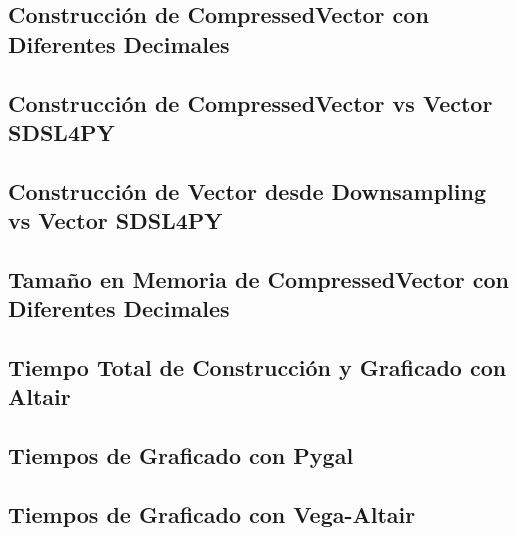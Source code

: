 \subsection{Construcción de CompressedVector con Diferentes Decimales}
\label{exp:cvd-build-decimals}

\subsection{Construcción de CompressedVector vs Vector SDSL4PY}
\label{exp:build-cv-sdsl}

\subsection{Construcción de Vector desde Downsampling vs Vector SDSL4PY}
\label{exp:build-cvd-sdsl}

\subsection{Tamaño en Memoria de CompressedVector con Diferentes Decimales}
\label{exp:cvd-size-decimals}

\subsection{Tiempo Total de Construcción y Graficado con Altair}
\label{exp:altair-total-time}

\subsection{Tiempos de Graficado con Pygal}
\label{exp:pygal-time}

\subsection{Tiempos de Graficado con Vega-Altair}
\label{exp:altair-time}
